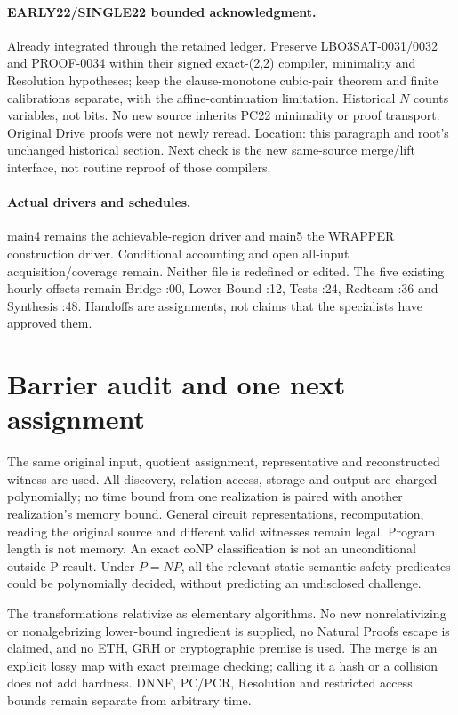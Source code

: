 \documentclass[11pt]{article}
\begin{document}
\paragraph{EARLY22/SINGLE22 bounded acknowledgment.}
Already integrated through the retained ledger. Preserve LBO3SAT-0031/0032
and PROOF-0034 within their signed exact-(2,2) compiler, minimality and
Resolution hypotheses; keep the clause-monotone cubic-pair theorem and finite
calibrations separate, with the affine-continuation limitation. Historical
$N$ counts variables, not bits. No new source inherits PC22 minimality or
proof transport. Original Drive proofs were not newly reread. Location: this
paragraph and root's unchanged historical section. Next check is the new
same-source merge/lift interface, not routine reproof of those compilers.

\paragraph{Actual drivers and schedules.}
main4 remains the achievable-region driver and main5 the WRAPPER construction
driver. Conditional accounting and open all-input acquisition/coverage remain.
Neither file is redefined or edited. The five existing hourly offsets remain
Bridge :00, Lower Bound :12, Tests :24, Redteam :36 and Synthesis :48.
Handoffs are assignments, not claims that the specialists have approved them.

\section{Barrier audit and one next assignment}
The same original input, quotient assignment, representative and reconstructed
witness are used. All discovery, relation access, storage and output are
charged polynomially; no time bound from one realization is paired with
another realization's memory bound. General circuit representations,
recomputation, reading the original source and different valid witnesses
remain legal. Program length is not memory. An exact coNP classification
is not an unconditional outside-P result. Under $P=NP$, all the relevant
static semantic safety predicates could be polynomially decided, without
predicting an undisclosed challenge.

The transformations relativize as elementary algorithms. No new
nonrelativizing or nonalgebrizing lower-bound ingredient is supplied, no
Natural Proofs escape is claimed, and no ETH, GRH or cryptographic premise
is used. The merge is an explicit lossy map with exact preimage checking;
calling it a hash or a collision does not add hardness. DNNF, PC/PCR,
Resolution and restricted access bounds remain separate from arbitrary time.
\end{document}
